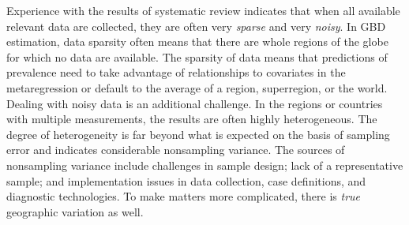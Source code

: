 Experience with the results of systematic review indicates that when
all available relevant data are collected, they are often very
\emph{sparse} and very \emph{noisy}.  In GBD estimation, data sparsity
often means that there are whole regions of the globe for which no
data are available.  The sparsity of data means that predictions of prevalence
need to take advantage of relationships to covariates in the
metaregression or default to the average of a region, superregion, or
the world.  Dealing with noisy data is an additional challenge. In the
regions or countries with multiple measurements, the results are often
highly heterogeneous. The degree of heterogeneity is far beyond what
is expected on the basis of sampling error and indicates considerable
nonsampling variance.  The sources of nonsampling variance include
challenges in sample design; lack of a representative sample; and
implementation issues in data collection, case definitions, and
diagnostic technologies.  To make matters more complicated, there
is \emph{true} geographic variation as well.

